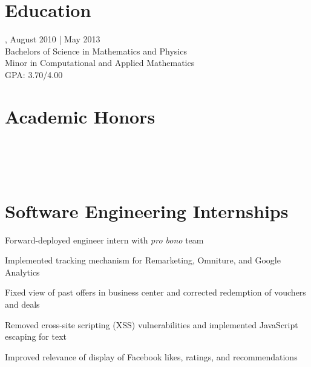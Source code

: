 \documentclass{onkursen-resume}
\begin{document}
\begin{multicols}{2}
\section*{Education}
, August 2010 | May 2013\\
Bachelors of Science in Mathematics and Physics\\
Minor in Computational and Applied Mathematics\\
GPA: 3.70/4.00

\section*{Academic Honors}
\noindent
{}\\
\\
\\
\end{multicols}

\hr

\section*{Software Engineering Internships}

\begin{itemize*}
\item Forward-deployed engineer intern with {\em pro bono} team
\end{itemize*}

\begin{itemize*}
\item Implemented tracking mechanism for Remarketing, Omniture, and Google Analytics
\item Fixed view of past offers in business center and corrected redemption of vouchers and deals
\end{itemize*}

\begin{itemize*}
\item Removed cross-site scripting (XSS) vulnerabilities and implemented JavaScript escaping for text
\item Improved relevance of display of Facebook likes, ratings, and recommendations
\end{itemize*}
\end{document}

